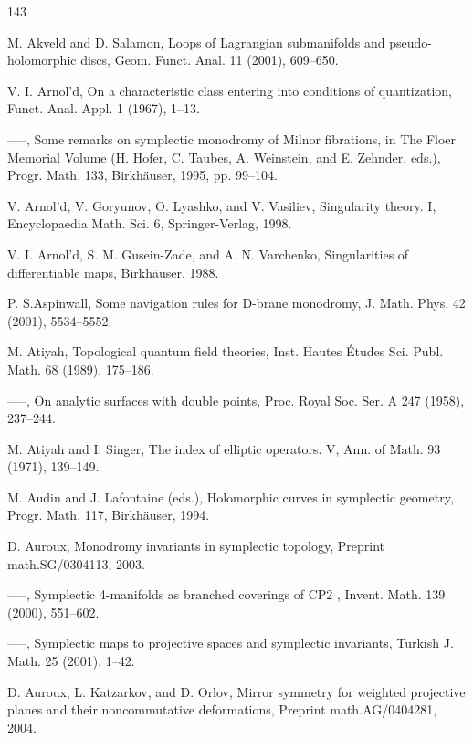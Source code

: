 \begin{thebibliography}{143}
\raggedright
{} M. Akveld and D. Salamon, Loops of Lagrangian submanifolds and pseudo-holomorphic discs, Geom. Funct. Anal. 11 (2001), 609–650.

 V. I. Arnol’d, On a characteristic class entering into conditions of quantization, Funct. Anal. Appl. 1 (1967), 1–13.

 —–, Some remarks on symplectic monodromy of Milnor fibrations, in The Floer Memorial Volume (H. Hofer, C. Taubes, A. Weinstein, and E. Zehnder, eds.), Progr. Math. 133, Birkhäuser, 1995, pp. 99–104.

 V. Arnol’d, V. Goryunov, O. Lyashko, and V. Vasiliev, Singularity theory. I, Encyclopaedia Math. Sci. 6, Springer-Verlag, 1998.

 V. I. Arnol’d, S. M. Gusein-Zade, and A. N. Varchenko, Singularities of differentiable maps, Birkhäuser, 1988.

 P. S.Aspinwall, Some navigation rules for D-brane monodromy, J. Math. Phys. 42 (2001), 5534–5552.

 M. Atiyah, Topological quantum field theories, Inst. Hautes Études Sci. Publ. Math. 68 (1989), 175–186.

 —–, On analytic surfaces with double points, Proc. Royal Soc. Ser. A 247 (1958), 237–244.

 M. Atiyah and I. Singer, The index of elliptic operators. V, Ann. of Math. 93 (1971), 139–149.

 M. Audin and J. Lafontaine (eds.), Holomorphic curves in symplectic geometry, Progr. Math. 117, Birkhäuser, 1994.

 D. Auroux, Monodromy invariants in symplectic topology, Preprint math.SG/0304113, 2003.

 —–, Symplectic 4-manifolds as branched coverings of CP2 , Invent. Math. 139 (2000), 551–602.

 —–, Symplectic maps to projective spaces and symplectic invariants, Turkish J. Math. 25 (2001), 1–42.

 D. Auroux, L. Katzarkov, and D. Orlov, Mirror symmetry for weighted projective planes and their noncommutative deformations, Preprint math.AG/0404281, 2004.


\end{thebibliography}

